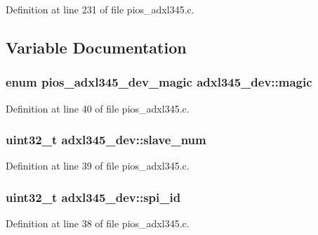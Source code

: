\-Definition at line 231 of file pios\-\_\-adxl345.\-c.



\subsection{\-Variable \-Documentation}
\hypertarget{group___p_i_o_s___a_d_x_l345_ga71c28fb64e7d683548f06eb171dc5cde}{
\subsubsection[{magic}]{\setlength{\rightskip}{0pt plus 5cm}enum {\bf pios\-\_\-adxl345\-\_\-dev\-\_\-magic} {\bf adxl345\-\_\-dev\-::magic}}}\label{group___p_i_o_s___a_d_x_l345_ga71c28fb64e7d683548f06eb171dc5cde}


\-Definition at line 40 of file pios\-\_\-adxl345.\-c.

\hypertarget{group___p_i_o_s___a_d_x_l345_ga0955d4176a279516aa3b7dcbea03965c}{
\subsubsection[{slave\-\_\-num}]{\setlength{\rightskip}{0pt plus 5cm}uint32\-\_\-t {\bf adxl345\-\_\-dev\-::slave\-\_\-num}}}\label{group___p_i_o_s___a_d_x_l345_ga0955d4176a279516aa3b7dcbea03965c}


\-Definition at line 39 of file pios\-\_\-adxl345.\-c.

\hypertarget{group___p_i_o_s___a_d_x_l345_ga2681cf2ea08ddf51ce6cea962e6ea9a7}{
\subsubsection[{spi\-\_\-id}]{\setlength{\rightskip}{0pt plus 5cm}uint32\-\_\-t {\bf adxl345\-\_\-dev\-::spi\-\_\-id}}}\label{group___p_i_o_s___a_d_x_l345_ga2681cf2ea08ddf51ce6cea962e6ea9a7}


\-Definition at line 38 of file pios\-\_\-adxl345.\-c.

